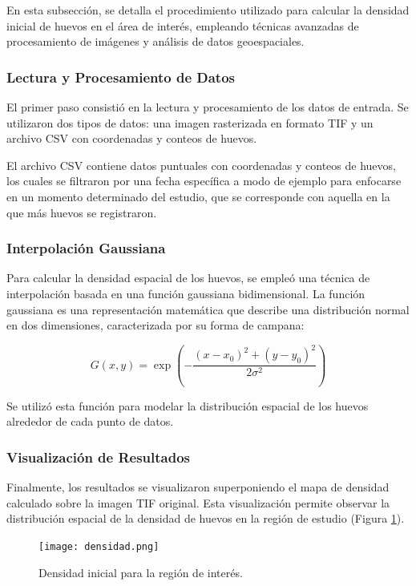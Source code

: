 En esta subsección, se detalla el procedimiento utilizado para calcular la densidad inicial de huevos en el área de interés, empleando técnicas avanzadas de procesamiento de imágenes y análisis de datos geoespaciales.

\subsubsection{Lectura y Procesamiento de Datos}

El primer paso consistió en la lectura y procesamiento de los datos de entrada. Se utilizaron dos tipos de datos: una imagen rasterizada en formato TIF y un archivo CSV con coordenadas y conteos de huevos.

El archivo CSV contiene datos puntuales con coordenadas y conteos de huevos, los cuales se filtraron por una fecha específica a modo de ejemplo para enfocarse en un momento determinado del estudio, que se corresponde con aquella en la que más huevos se registraron.

\subsubsection{Interpolación Gaussiana}

Para calcular la densidad espacial de los huevos, se empleó una técnica de interpolación basada en una función gaussiana bidimensional. La función gaussiana es una representación matemática que describe una distribución normal en dos dimensiones, caracterizada por su forma de campana:

\begin{equation}
	G(x, y) = \exp\left(-\frac{(x - x_0)^2 + (y - y_0)^2}{2\sigma^2}\right)
\end{equation}

Se utilizó esta función para modelar la distribución espacial de los huevos alrededor de cada punto de datos. 

\subsubsection{Visualización de Resultados}

Finalmente, los resultados se visualizaron superponiendo el mapa de densidad calculado sobre la imagen TIF original. Esta visualización permite observar la distribución espacial de la densidad de huevos en la región de estudio (Figura \ref{fig:densidad}).

\begin{figure}[H]
	\texttt{[image: densidad.png]}
	\centering
	\caption{Densidad inicial para la región de interés.}
	\label{fig:densidad}
\end{figure}


